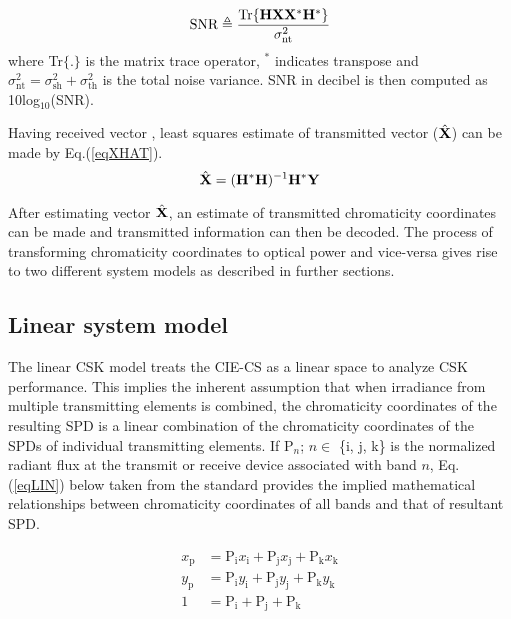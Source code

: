 \begin{equation}
	\text{SNR} \triangleq \frac{\text{Tr}\{{\bf{H}}{\bf{X}}{\bf{X}}^{*}{\bf{H}}^{*}\}}{\sigma^{2}_{\text{nt}}}
	\label{eqSNR}
\end{equation}
where Tr$\{.\}$ is the matrix trace operator, $^{*}$ indicates transpose and $\sigma^{2}_{\text{nt}}=\sigma^{2}_{\text{sh}}+\sigma^{2}_{\text{th}}$ is the total noise variance. SNR in decibel is then computed as 10log$^{ }_{10}$(SNR).

Having received vector , least squares estimate of transmitted vector ($\hat{{\bf{X}}}$) can be made by Eq.(\ref{eqXHAT}).
\begin{equation}
	\hat{{\bf{X}}} = ({\bf{H}}^{*}{\bf{H}})^{-1}{\bf{H}}^{*}{\bf{Y}}
	\label{eqXHAT}
\end{equation}

After estimating vector $\hat{{\bf{X}}}$, an estimate of transmitted chromaticity coordinates can be made and transmitted information can then be decoded. The process of transforming chromaticity coordinates to optical power and vice-versa gives rise to two different system models as described in further sections.

\subsection{Linear system model}
\label{subsec:cskLinear}
The linear CSK model treats the CIE-CS as a linear space to analyze CSK performance. This implies the inherent assumption that when irradiance from multiple transmitting elements is combined, the chromaticity coordinates of the resulting SPD is a linear combination of the chromaticity coordinates of the SPDs of individual transmitting elements. If P$_{n}$; $n\in$ \{i, j, k\} is the normalized radiant flux at the transmit or receive device associated with band $n$, Eq.(\ref{eqLIN}) below taken from the standard provides the implied mathematical relationships between chromaticity coordinates of all bands and that of resultant SPD.

\begin{equation}
	\begin{aligned}
	x_{\text{p}} &= \text{P}_{\text{i}}x_{\text{i}} + \text{P}_{\text{j}}x_{\text{j}} + \text{P}_{\text{k}}x_{\text{k}}\\
	y_{\text{p}} &= \text{P}_{\text{i}}y_{\text{i}} + \text{P}_{\text{j}}y_{\text{j}} + \text{P}_{\text{k}}y_{\text{k}}\\
	1 &= \text{P}_{\text{i}} + \text{P}_{\text{j}} + \text{P}_{\text{k}}
\end{aligned}
\label{eqLIN}
\end{equation}

